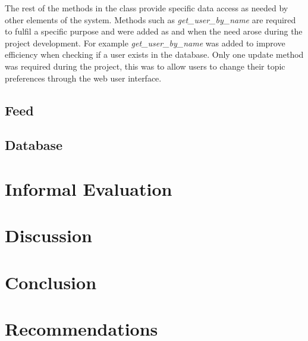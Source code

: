 \documentclass[12pt,titlepage]{article}
\begin{document}
  The rest of the methods in the class provide specific data access as needed by
  other elements of the system. Methods such as \textit{get\_user\_by\_name} are
  required to fulfil a specific purpose and were added as and when the need
  arose during the project development. For example \textit{get\_user\_by\_name}
  was added to improve efficiency when checking if a user exists in the
  database. Only one update method was required during the project, this was to
  allow users to change their topic preferences through the web user interface.

  \subsection{Feed}


  \subsection{Database}




\section{Informal Evaluation}


\section{Discussion}


\section{Conclusion}


\section{Recommendations}



\end{document}
